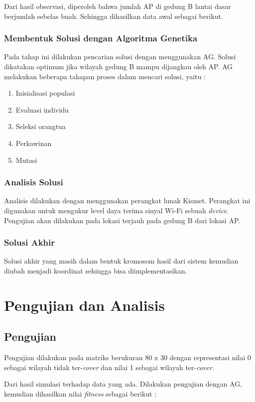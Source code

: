 \documentclass[12pt,a4paper]{report}
\begin{document}
		Dari hasil observasi, diperoleh bahwa jumlah AP di gedung B lantai dasar berjumlah sebelas buah. Sehingga dihasilkan data awal sebagai berikut.
		\subsection{Membentuk Solusi dengan Algoritma Genetika}
		Pada tahap ini dilakukan pencarian solusi dengan menggunakan AG. Solusi dikatakan optimum jika wilayah  gedung B mampu dijangkau oleh AP. AG melakukan beberapa tahapan proses dalam mencari solusi, yaitu :
		\begin{enumerate}
			\item Inisialisasi populasi
			\item Evaluasi individu
			\item Seleksi orangtua
			\item Perkawinan
			\item Mutasi
		\end{enumerate}
		\subsection{Analisis Solusi}
		Analisis dilakukan dengan menggunakan perangkat lunak Kismet. Perangkat ini digunakan untuk mengukur level daya terima sinyal Wi-Fi sebuah \emph{device}. Pengujian akan dilakukan pada lokasi terjauh pada gedung B dari lokasi AP. 
		
		\subsection{Solusi Akhir}
		Solusi akhir yang masih dalam bentuk kromosom hasil dari sistem kemudian diubah menjadi koordinat sehingga bisa diimplementasikan.
		
		\newpage
		\chapter{Pengujian dan Analisis}
		\section{Pengujian}
		Pengujian dilakukan pada matriks berukuran 80 x 30 dengan representasi nilai 0 sebagai wilayah tidak ter-\emph{cover} dan nilai 1 sebagai wilayah ter-\emph{cover}.
		
		Dari hasil simulasi terhadap data yang ada. Dilakukan pengujian dengan AG, kemudian dihasilkan nilai \emph{fitness} sebagai berikut :
\end{document}
